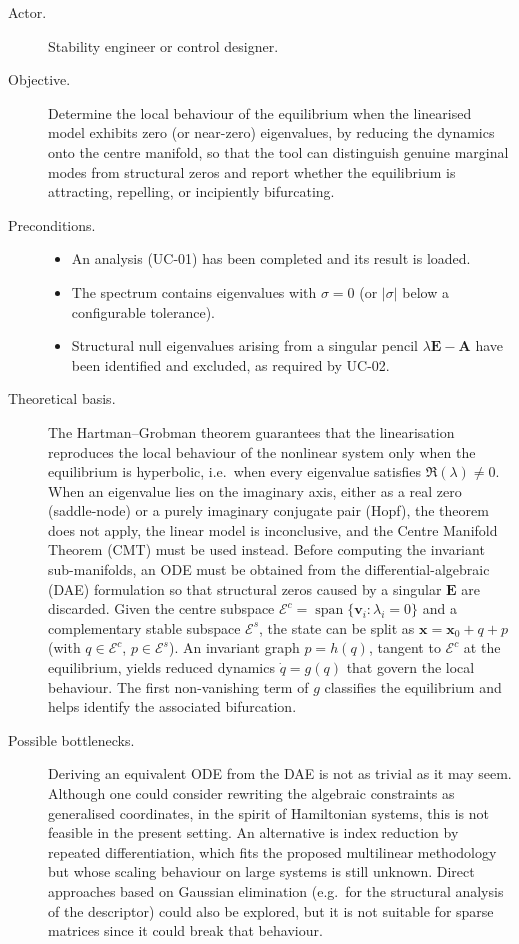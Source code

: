 \begin{description}
  \item[Actor.] Stability engineer or control designer.
  \item[Objective.] Determine the local behaviour of the equilibrium when the linearised model exhibits zero (or near-zero) eigenvalues, by reducing the dynamics onto the centre manifold, so that the tool can distinguish genuine marginal modes from structural zeros and report whether the equilibrium is attracting, repelling, or incipiently bifurcating.
  \item[Preconditions.]
        \begin{itemize}[before=\leavevmode, leftmargin=*]
          \item An analysis (UC-01) has been completed and its result is loaded.
          \item The spectrum contains eigenvalues with $\sigma = 0$ (or $\lvert\sigma\rvert$ below a configurable tolerance).
          \item Structural null eigenvalues arising from a singular pencil $\lambda\mathbf{E}-\mathbf{A}$ have been identified and excluded, as required by UC-02.
        \end{itemize}
  \item[Theoretical basis.] The Hartman--Grobman theorem guarantees that the linearisation reproduces the local behaviour of the nonlinear system only when the equilibrium is hyperbolic, i.e.\ when every eigenvalue satisfies $\Re(\lambda)\neq 0$. When an eigenvalue lies on the imaginary axis, either as a real zero (saddle-node) or a purely imaginary conjugate pair (Hopf), the theorem does not apply, the linear model is inconclusive, and the Centre Manifold Theorem (CMT) must be used instead. Before computing the invariant sub-manifolds, an ODE must be obtained from the differential-algebraic (DAE) formulation so that structural zeros caused by a singular $\mathbf{E}$ are discarded. Given the centre subspace $\mathcal{E}^{c}=\operatorname{span}\{\mathbf{v}_i:\lambda_i=0\}$ and a complementary stable subspace $\mathcal{E}^{s}$, the state can be split as $\mathbf{x}=\mathbf{x}_0+q+p$ (with $q\in\mathcal{E}^{c}$, $p\in\mathcal{E}^{s}$). An invariant graph $p=h(q)$, tangent to $\mathcal{E}^{c}$ at the equilibrium, yields reduced dynamics $\dot{q}=g(q)$ that govern the local behaviour. The first non-vanishing term of $g$ classifies the equilibrium and helps identify the associated bifurcation.
  \item[Possible bottlenecks.] Deriving an equivalent ODE from the DAE is not as trivial as it may seem. Although one could consider rewriting the algebraic constraints as generalised coordinates, in the spirit of Hamiltonian systems, this is not feasible in the present setting. An alternative is index reduction by repeated differentiation, which fits the proposed multilinear methodology but whose scaling behaviour on large systems is still unknown. Direct approaches based on Gaussian elimination (e.g.\ for the structural analysis of the descriptor) could also be explored, but it is not suitable for sparse matrices since it could break that behaviour.

\end{description}
